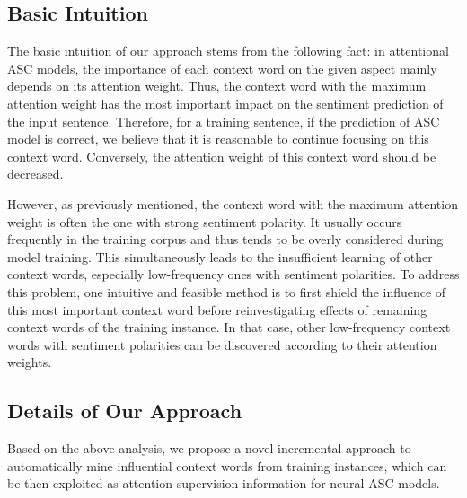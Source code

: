 \documentclass[11pt,a4paper]{article}
\begin{document}
\subsection{Basic Intuition}\label{SubSection_BasicIntuition}

The basic intuition of our approach stems from the following fact:
in attentional ASC models,
the importance of each context word on the given aspect mainly depends on its attention weight.
Thus,
the context word with the maximum attention weight has the most important impact on the sentiment prediction of the input sentence.
Therefore,
for a training sentence,
if the prediction of ASC model is correct,
we believe that it is reasonable to continue focusing on this context word.
Conversely,
the attention weight of this context word should be decreased.

However,
as previously mentioned,
the context word with the maximum attention weight is often the one with strong sentiment polarity.
It usually occurs frequently in the training corpus
and thus tends to be overly considered during model training.
This simultaneously leads to the insufficient learning of other context words,
especially low-frequency ones with sentiment polarities.
To address this problem,
one intuitive and feasible method is to first shield the influence of this most important context word
before reinvestigating effects of remaining context words of the training instance.
In that case,
other low-frequency context words with sentiment polarities can be discovered according to their attention weights.


\subsection{Details of Our Approach}\label{SubSection_ApproachDetails}
Based on the above analysis,
we propose a novel incremental approach to automatically mine influential context words from training instances,
which can be then exploited as attention supervision information for neural ASC models.
\end{document}
